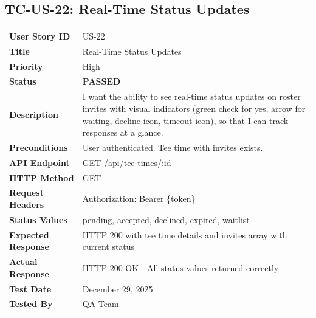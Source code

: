 \documentclass[11pt,a4paper]{article}
\newcommand{\passed}{\textcolor{pass}{\textbf{PASSED}}}
\begin{document}
\vspace{0.5cm}


\subsection{TC-US-22: Real-Time Status Updates}

\begin{tabularx}{\textwidth}{|p{3.2cm}|Y|}
\hline
{}
 \\
\hline
\textbf{User Story ID} & US-22 \\
\hline
\textbf{Title} & Real-Time Status Updates \\
\hline
\textbf{Priority} & High \\
\hline
\textbf{Status} & \passed \\
\hline
\textbf{Description} & I want the ability to see real-time status updates on roster invites with visual indicators (green check for yes, arrow for waiting, decline icon, timeout icon), so that I can track responses at a glance. \\
\hline
\textbf{Preconditions} & User authenticated. Tee time with invites exists. \\
\hline
\textbf{API Endpoint} & GET /api/tee-times/:id \\
\hline
\textbf{HTTP Method} & GET \\
\hline
\textbf{Request Headers} & Authorization: Bearer \{token\} \\
\hline
\textbf{Status Values} & pending, accepted, declined, expired, waitlist \\
\hline
\textbf{Expected Response} & HTTP 200 with tee time details and invites array with current status \\
\hline
\textbf{Actual Response} & HTTP 200 OK - All status values returned correctly \\
\hline
\textbf{Test Date} & December 29, 2025 \\
\hline
\textbf{Tested By} & QA Team \\
\hline
\end{tabularx}
\end{document}
